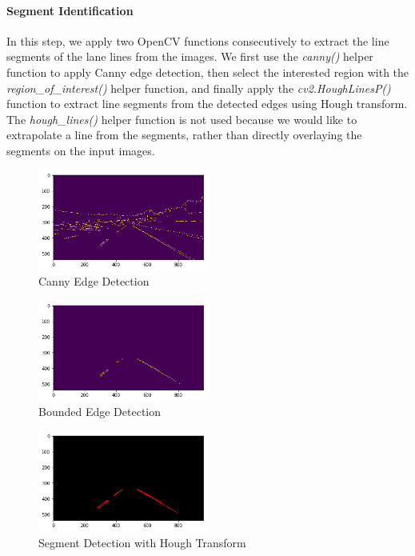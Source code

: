 \documentclass[]{article}
\begin{document}
\paragraph{Segment Identification}
In this step, we apply two OpenCV functions consecutively to extract the line segments of the lane lines from the images. We first use the \textit{canny()} helper function to apply Canny edge detection, then select the interested region with the \textit{region\_of\_interest()} helper function, and finally apply the \textit{cv2.HoughLinesP()} function to extract line segments from the detected edges using Hough transform. The \textit{hough\_lines()} helper function is not used because we would like to extrapolate a line from the segments, rather than directly overlaying the segments on the input images.

\begin{figure}[h]
	\centering
	\includegraphics[width=0.5\textwidth]{canny}
	\caption{Canny Edge Detection}
\end{figure}

\begin{figure}[h]
	\centering
	\includegraphics[width=0.5\textwidth]{canny_bound}
	\caption{Bounded Edge Detection}
\end{figure}

\begin{figure}[h]
	\centering
	\includegraphics[width=0.5\textwidth]{hough}
	\caption{Segment Detection with Hough Transform}
\end{figure}
\end{document}
